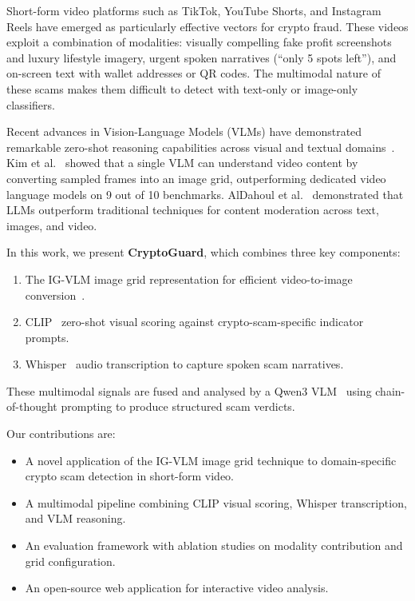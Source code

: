 \documentclass[12pt,a4paper]{article}
\begin{document}
Short-form video platforms such as TikTok, YouTube Shorts, and Instagram
Reels have emerged as particularly effective vectors for crypto fraud.
These videos exploit a combination of modalities: visually compelling
fake profit screenshots and luxury lifestyle imagery, urgent spoken
narratives (``only 5 spots left''), and on-screen text with wallet
addresses or QR codes. The multimodal nature of these scams makes them
difficult to detect with text-only or image-only classifiers.

Recent advances in Vision-Language Models (VLMs) have demonstrated
remarkable zero-shot reasoning capabilities across visual and textual
domains~\cite{bordes2024vlm}. Kim et al.~\cite{kim2024imagegrid} showed
that a single VLM can understand video content by converting sampled frames
into an image grid, outperforming dedicated video language models on
9 out of 10 benchmarks. AlDahoul et al.~\cite{aldahoul2024contentmod}
demonstrated that LLMs outperform traditional techniques for content
moderation across text, images, and video.

In this work, we present \textbf{CryptoGuard}, which combines three
key components:
\begin{enumerate}[nosep]
  \item The IG-VLM image grid representation for efficient video-to-image
    conversion~\cite{kim2024imagegrid}.
  \item CLIP~\cite{radford2021clip} zero-shot visual scoring against
    crypto-scam-specific indicator prompts.
  \item Whisper~\cite{radford2023whisper} audio transcription to capture
    spoken scam narratives.
\end{enumerate}
These multimodal signals are fused and analysed by a Qwen3
VLM~\cite{qwen2024} using chain-of-thought prompting to produce
structured scam verdicts.

Our contributions are:
\begin{itemize}[nosep]
  \item A novel application of the IG-VLM image grid technique to
    domain-specific crypto scam detection in short-form video.
  \item A multimodal pipeline combining CLIP visual scoring, Whisper
    transcription, and VLM reasoning.
  \item An evaluation framework with ablation studies on modality
    contribution and grid configuration.
  \item An open-source web application for interactive video analysis.
\end{itemize}
\end{document}
